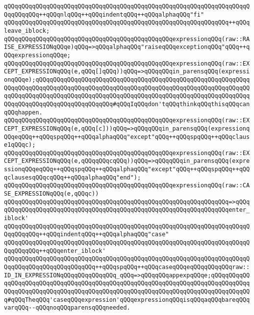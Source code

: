 \verb|qQQqqQQqqQQqqQQqqQQqqQQqqQQqqQQqqQQqqQQqqQQqqQQqqQQqqQQqqQQqqQQqqQQqqQQqqQQqqQQq++qQQqnlqQQq++qQQqindentqQQq++qQQqalphaqQQq"fi"|\newline
\verb|qQQqqQQqqQQqqQQqqQQqqQQqqQQqqQQqqQQqqQQqqQQqqQQqqQQqqQQqqQQqqQQq++qQQqleave_iblock;|\newline
\newline
\verb|qQQqqQQqqQQqqQQqqQQqqQQqqQQqqQQqqQQqqQQqqQQqqQQqexpressionqQQq(raw::RAISE_EXPRESSIONqQQqe)qQQq=>qQQqalphaqQQq"raiseqQQqexceptionqQQq"qQQq++qQQqexpressionqQQqe;|\newline
\newline
\verb|qQQqqQQqqQQqqQQqqQQqqQQqqQQqqQQqqQQqqQQqqQQqqQQqexpressionqQQq(raw::EXCEPT_EXPRESSIONqQQq(e,qQQq[]qQQq))qQQq=>qQQqqQQqin_parensqQQq(expressionqQQqe);qQQqqQQqqQQqqQQqqQQqqQQqqQQqqQQqqQQqqQQqqQQqqQQqqQQqqQQqqQQqqQQqqQQqqQQqqQQqqQQqqQQqqQQqqQQqqQQqqQQqqQQqqQQqqQQqqQQqqQQqqQQqqQQqqQQqqQQqqQQqqQQqqQQqqQQqqQQqqQQqqQQqqQQqqQQqqQQqqQQqqQQqqQQqqQQqqQQqqQQqqQQqqQQqqQQqqQQqqQQqqQQqqQQqqQQq#qQQqIqQQqdon'tqQQqthinkqQQqthisqQQqcanqQQqhappen.|\newline
\verb|qQQqqQQqqQQqqQQqqQQqqQQqqQQqqQQqqQQqqQQqqQQqqQQqexpressionqQQq(raw::EXCEPT_EXPRESSIONqQQq(e,qQQq[c]))qQQq=>qQQqqQQqin_parensqQQq(expressionqQQqeqQQq++qQQqspqQQq++qQQqalphaqQQq"except"qQQq++qQQqspqQQq++qQQqclause1qQQqc);|\newline
\verb|qQQqqQQqqQQqqQQqqQQqqQQqqQQqqQQqqQQqqQQqqQQqqQQqexpressionqQQq(raw::EXCEPT_EXPRESSIONqQQq(e,qQQqqQQqcqQQq))qQQq=>qQQqqQQqin_parensqQQq(expressionqQQqeqQQq++qQQqspqQQq++qQQqalphaqQQq"except"qQQq++qQQqspqQQq++qQQqclausesqQQqcqQQq++qQQqalphaqQQq"end");|\newline
\newline
\verb|qQQqqQQqqQQqqQQqqQQqqQQqqQQqqQQqqQQqqQQqqQQqqQQqexpressionqQQq(raw::CASE_EXPRESSIONqQQq(e,qQQqc))|\newline
\verb|qQQqqQQqqQQqqQQqqQQqqQQqqQQqqQQqqQQqqQQqqQQqqQQqqQQqqQQqqQQqqQQq=>qQQq|\newline
\verb|qQQqqQQqqQQqqQQqqQQqqQQqqQQqqQQqqQQqqQQqqQQqqQQqqQQqqQQqqQQqqQQqenter_iblock'|\newline
\verb|qQQqqQQqqQQqqQQqqQQqqQQqqQQqqQQqqQQqqQQqqQQqqQQqqQQqqQQqqQQqqQQqqQQqqQQqqQQqqQQq++qQQqindentqQQq++qQQqalphaqQQq"case"|\newline
\verb|qQQqqQQqqQQqqQQqqQQqqQQqqQQqqQQqqQQqqQQqqQQqqQQqqQQqqQQqqQQqqQQqqQQqqQQqqQQqqQQq++qQQqenter_iblock'|\newline
\verb|qQQqqQQqqQQqqQQqqQQqqQQqqQQqqQQqqQQqqQQqqQQqqQQqqQQqqQQqqQQqqQQqqQQqqQQqqQQqqQQqqQQqqQQqqQQqqQQq++qQQqspqQQq++qQQqcaseqQQqeqQQqqQQqqQQqraw::ID_IN_EXPRESSIONqQQqqQQqqQQqqQQq_qQQq=>qQQqqQQqappexpqQQqe;qQQqqQQqqQQqqQQqqQQqqQQqqQQqqQQqqQQqqQQqqQQqqQQqqQQqqQQqqQQqqQQqqQQqqQQqqQQqqQQqqQQqqQQqqQQqqQQqqQQqqQQqqQQqqQQqqQQqqQQqqQQqqQQqqQQqqQQqqQQqqQQqqQQqqQQq#qQQqTheqQQq'caseqQQqexpression'qQQqexpressionqQQqisqQQqaqQQqbareqQQqvarqQQq--qQQqnoqQQqparensqQQqneeded.|\newline
